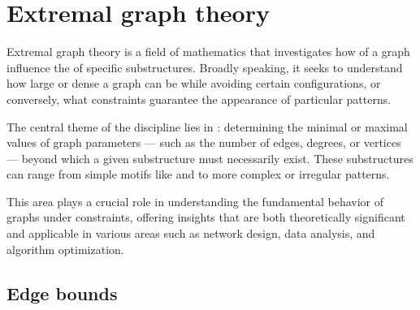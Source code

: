 \documentclass[a4paper, 12pt]{report}
\begin{document}

    \chapter{Extremal graph theory}

    Extremal graph theory is a field of mathematics that investigates how  of a graph influence the  of specific substructures. Broadly speaking, it seeks to understand how large or dense a graph can be while avoiding certain configurations, or conversely, what constraints guarantee the appearance of particular patterns.

    The central theme of the discipline lies in : determining the minimal or maximal values of graph parameters --- such as the number of edges, degrees, or vertices --- beyond which a given substructure must necessarily exist. These substructures can range from simple motifs like  and  to more complex or irregular patterns.

    This area plays a crucial role in understanding the fundamental behavior of graphs under constraints, offering insights that are both theoretically significant and applicable in various areas such as network design, data analysis, and algorithm optimization.

    \section{Edge bounds}
\end{document}
